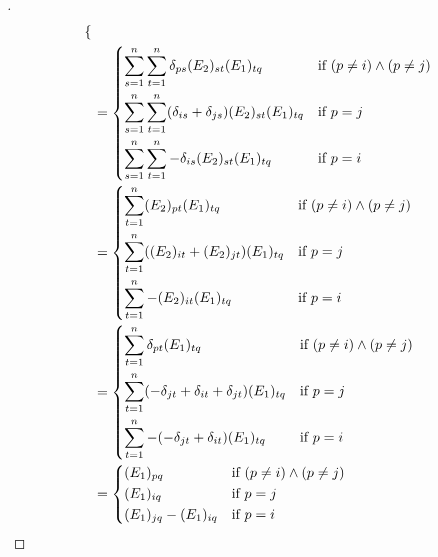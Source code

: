\begin{proof}[]
\begin{align*}
\begin{dcases}
         \end{dcases}                                                                    \\
     & = \begin{dcases}
           \sum_{s = 1}^n \sum_{t = 1}^n \delta_{p s} (E_2)_{s t} (E_1)_{t q}                  & \text{if } (p \neq i) \land (p \neq j) \\
           \sum_{s = 1}^n \sum_{t = 1}^n (\delta_{i s} + \delta_{j s}) (E_2)_{s t} (E_1)_{t q} & \text{if } p = j                       \\
           \sum_{s = 1}^n \sum_{t = 1}^n -\delta_{i s} (E_2)_{s t} (E_1)_{t q}                 & \text{if } p = i
         \end{dcases}                                \\
     & = \begin{dcases}
           \sum_{t = 1}^n (E_2)_{p t} (E_1)_{t q}                 & \text{if } (p \neq i) \land (p \neq j) \\
           \sum_{t = 1}^n ((E_2)_{i t} + (E_2)_{j t}) (E_1)_{t q} & \text{if } p = j                       \\
           \sum_{t = 1}^n -(E_2)_{i t} (E_1)_{t q}                & \text{if } p = i
         \end{dcases}                                                             \\
     & = \begin{dcases}
           \sum_{t = 1}^n \delta_{p t} (E_1)_{t q}                                  & \text{if } (p \neq i) \land (p \neq j) \\
           \sum_{t = 1}^n (-\delta_{j t} + \delta_{i t} + \delta_{j t}) (E_1)_{t q} & \text{if } p = j                       \\
           \sum_{t = 1}^n -(-\delta_{j t} + \delta_{i t}) (E_1)_{t q}               & \text{if } p = i
         \end{dcases}                                           \\
     & = \begin{dcases}
           (E_1)_{p q}               & \text{if } (p \neq i) \land (p \neq j) \\
           (E_1)_{i q}               & \text{if } p = j                       \\
           (E_1)_{j q} - (E_1)_{i q} & \text{if } p = i
         \end{dcases}                                                                                          \\

\end{align*}
\end{proof}
